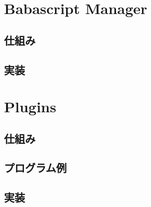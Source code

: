\section{Babascript Manager}
\subsection{仕組み}
\subsection{実装}

\section{Plugins}
\subsection{仕組み}
\subsection{プログラム例}
\subsection{実装}
